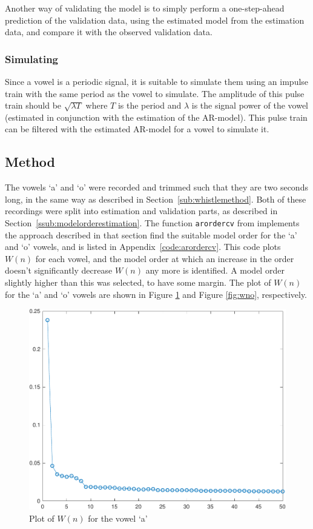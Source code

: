 \documentclass{IEEEtran}
\newcommand{\code}[1]{\texttt{#1}}
\begin{document}
Another way of validating the model is to simply perform a one-step-ahead
prediction of the validation data, using the estimated model from the
estimation data, and compare it with the observed validation data.

\subsubsection{Simulating}
Since a vowel is a periodic signal, it is suitable to simulate them using an
impulse train with the same period as the vowel to simulate. The amplitude
of this pulse train should be $\sqrt{\lambda T}$ where $T$ is the period and
$\lambda$ is the signal power of the vowel (estimated in conjunction with the
estimation of the AR-model).
This pulse train can be filtered with the estimated AR-model for a vowel
to simulate it.

\subsection{Method}
The vowels `a' and `o' were recorded and trimmed such that they are two seconds
long, in the same way as described in Section~\ref{sub:whistlemethod}.
Both of these recordings were split into estimation and validation parts,
as described in Section~\ref{ssub:modelorderestimation}. The function
\code{arordercv} from \cite{signalproc} implements the approach described in
that section find the suitable model order for the `a' and `o' vowels, and is
listed in Appendix~\ref{code:arordercv}. This code plots $W(n)$ for each
vowel, and the model order at which an increase in the order doesn't
significantly decrease $W(n)$ any more is identified. A model order slightly
higher than this was selected, to have some margin. The plot of $W(n)$ for the
`a' and `o' vowels are shown in Figure \ref{fig:wna} and Figure \ref{fig:wno},
respectively.

\begin{figure}[h!]
    \centering
    \captionsetup{justification=centering}
    \includegraphics[width=0.8\columnwidth]{pictures/wna.pdf}
    \caption{Plot of $W(n)$ for the vowel `a'}
    \label{fig:wna}
\end{figure}
\end{document}
